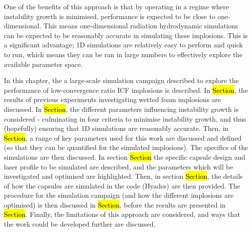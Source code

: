 One of the benefits of this approach is that by operating in a regime where instability growth is minimised, performance is expected to be close to one-dimensional. This means one-dimensional radiation hydrodynamic simulations can be expected to be reasonably accurate in simulating these implosions. This is a significant advantage; 1D simulations are relatively easy to perform and quick to run, which means they can be ran in large numbers to effectively explore the available parameter space.

In this chapter, the a large-scale simulation campaign described to explore the performance of low-convergence ratio ICF implosions is described. In \hl{Section}, the results of previous experiments investigating wetted foam implosions are discussed. In \hl{Section}, the different parameters influencing instability growth is considered - culminating in four criteria to minimise instability growth, and thus (hopefully) ensuring that 1D simulations are reasonably accurate. Then, in \hl{Section}, a range of key parameters used for this work are discussed and defined (so that they can be quantified for the simulated implosions). The specifics of the simulations are then discussed. In section \hl{Section} the specific capsule design and laser profile to be simulated are described, and the parameters which will be investigated and optimised are highlighted. Then, in section \hl{Section}, the details of how the capsules are simulated in the code (Hyades) are then provided. The procedure for the simulation campaign (and how the different implosions are optimised) is then discussed in \hl{Section}, before the results are presented in \hl{Section}. Finally, the limitations of this approach are considered, and ways that the work could be developed further are discussed.




